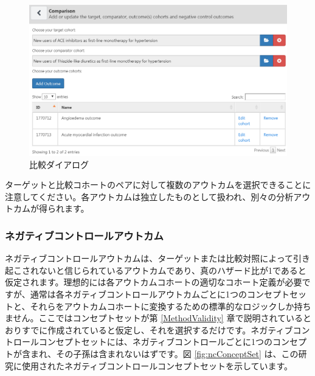 \documentclass[
  11pt]{book}
\theoremstyle{definition}
\theoremstyle{definition}
\theoremstyle{definition}
\theoremstyle{definition}
\theoremstyle{remark}
\begin{document}
\begin{figure}

{\centering \includegraphics[width=1\linewidth]{images/PopulationLevelEstimation/comparisons} 

}

\caption{比較ダイアログ}\label{fig:comparisons}
\end{figure}

ターゲットと比較コホートのペアに対して複数のアウトカムを選択できることに注意してください。各アウトカムは独立したものとして扱われ、別々の分析アウトカムが得られます。

\subsubsection*{ネガティブコントロールアウトカム}\label{ux30cdux30acux30c6ux30a3ux30d6ux30b3ux30f3ux30c8ux30edux30fcux30ebux30a2ux30a6ux30c8ux30abux30e0}

ネガティブコントロールアウトカムは、ターゲットまたは比較対照によって引き起こされないと信じられているアウトカムであり、真のハザード比が1であると仮定されます。理想的には各アウトカムコホートの適切なコホート定義が必要ですが、通常は各ネガティブコントロールアウトカムごとに1つのコンセプトセットと、それらをアウトカムコホートに変換するための標準的なロジックしか持ちません。ここではコンセプトセットが第 \ref{MethodValidity} 章で説明されているとおりすでに作成されていると仮定し、それを選択するだけです。ネガティブコントロールコンセプトセットには、ネガティブコントロールごとに1つのコンセプトが含まれ、その子孫は含まれないはずです。図 \ref{fig:ncConceptSet} は、この研究に使用されたネガティブコントロールコンセプトセットを示しています。
\end{document}
